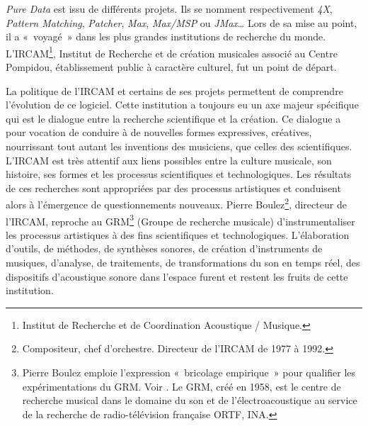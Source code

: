 \documentclass{FramateX}
\begin{document}
\begin{refsection}
\textit{Pure Data} est issu de différents projets. Ils se nomment respectivement
\textit{4X}, \textit{Pattern Matching}, \textit{Patcher}, \textit{Max}, \textit{Max/MSP} ou \textit{JMax}… Lors de sa mise au
point, il a «~voyagé~» dans les plus grandes institutions de recherche
du monde. L'IRCAM\footnote{Institut de Recherche et de Coordination
Acoustique / Musique.}, Institut de Recherche et de création musicales
associé au Centre Pompidou, établissement public à caractère culturel,
fut un point de départ. 

La politique de l'IRCAM et certains de ses projets permettent de
comprendre l'évolution de ce logiciel. Cette institution a toujours eu
un axe majeur spécifique qui est le dialogue entre la recherche
scientifique et la création. Ce dialogue a pour vocation de conduire à
de nouvelles formes expressives, créatives, nourrissant tout autant les
inventions des musiciens, que celles des scientifiques. L'IRCAM est
très attentif aux liens possibles entre la culture musicale, son
histoire, ses formes et les processus scientifiques et technologiques.
Les résultats de ces recherches sont appropriées par des processus
artistiques et conduisent alors à l'émergence de questionnements
nouveaux. Pierre Boulez\footnote{Compositeur, chef d'orchestre.
Directeur de l'IRCAM de 1977 à 1992.}, directeur de l'IRCAM, reproche au
GRM\footnote{Pierre Boulez emploie l'expression «~bricolage
empirique~» pour qualifier les expérimentations du GRM. Voir \cite[p.~297]{Grynszpan2004}.
Le GRM, créé en 1958, est le centre de
recherche musical dans le domaine du son et de l'électroacoustique au
service de la recherche de radio-télévision française ORTF, INA.}
(Groupe de recherche musicale) d'instrumentaliser les
processus artistiques à des fins scientifiques et technologiques.
L'élaboration d'outils, de méthodes, de synthèses sonores, de création
d'instruments de musiques, d'analyse, de traitements, de
transformations du son en temps réel, des dispositifs d'acoustique
sonore dans l'espace furent et restent les fruits de cette institution.


\end{refsection}
\end{document}
